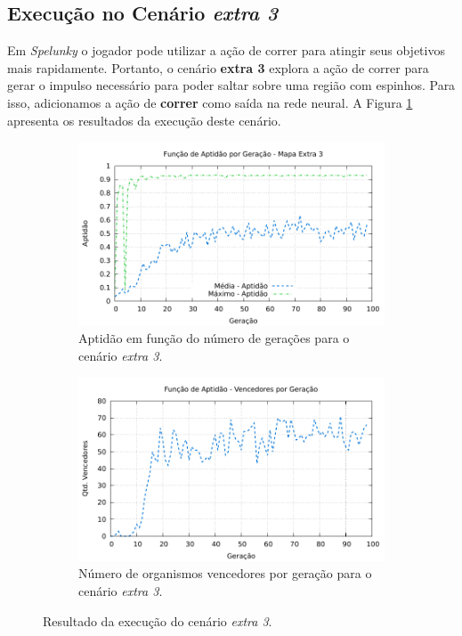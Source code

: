 \subsection{\label{section:experiment-extra3}Execução no Cenário \textit{extra
3}}

Em \textit{Spelunky} o jogador pode utilizar a ação de correr para atingir seus
objetivos mais rapidamente. Portanto, o cenário \textbf{extra 3} explora a ação
de correr para gerar o impulso necessário para poder saltar sobre uma região com
espinhos. Para isso, adicionamos a ação de \textbf{correr} como saída na rede
neural.  A Figura \ref{fig:extra3-results} apresenta os resultados da execução
deste cenário.

\begin{figure}[H]
\centering
	\begin{subfigure}[b]{0.45\textwidth}
        \includegraphics[width=\textwidth]{fig/extra3-fitness.pdf}
        \caption{Aptidão em função do número de gerações para o cenário
        \textit{extra 3}.}
	\end{subfigure}
	\begin{subfigure}[b]{0.45\textwidth}
        \includegraphics[width=\textwidth]{fig/extra3-winners.pdf}
        \caption{Número de organismos vencedores por geração para o cenário
        \textit{extra 3}.}
	\end{subfigure}

    \caption{Resultado da execução do cenário \textit{extra 3}.}
	\label{fig:extra3-results}
\end{figure}

